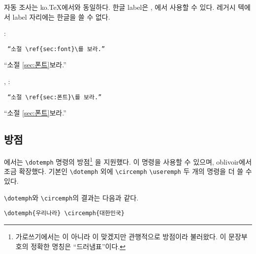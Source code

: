 \documentclass[
	12pt,
	a4paper,
	kosection,
	footnote,
	nobookmarks,
	microtype,
]{oblivoir}
\def\myREF#1#2{\ref{#1}}
\def\myREF#1#2{\ref{#2}}
\def\cs#1{\texttt{\textbackslash #1}}
\def\xetexko{\XeTeX-\ko}
\def\luatexko{\LuaTeX-\ko}
\begin{document}
자동 조사는 ko.\TeX 에서와 동일하다.
한글 label은 \XeTeX, \LuaTeX 에서 사용할 수 있다.
레거시 텍에서 label 자리에는 한글을 쓸 수 없다. 

\medskip

\noindent{}:\\
\noindent\begin{minipage}{.45\textwidth}
\begin{verbatim}
 “소절 \ref{sec:font}\를 보라.”
\end{verbatim}
\end{minipage}\hfill
\begin{minipage}{.45\textwidth}
\hfill “소절 \myREF{sec:font}{sec:폰트}\를 보라.”
\end{minipage}

\noindent{}, :\\
\noindent\begin{minipage}{.45\textwidth}
\begin{verbatim}
 “소절 \ref{sec:폰트}\를 보라.”
\end{verbatim}
\end{minipage}\hfill
\begin{minipage}{.45\textwidth}
\hfill “소절 \myREF{sec:font}{sec:폰트}\를 보라.”
\end{minipage}

\subsection{방점}

\koTeX 에서는 \texttt{\textbackslash dotemph} 명령의 방점\footnote{%
	가로쓰기에서는  이 아니라
	이 맞겠지만 관행적으로 방점이라 불러왔다.
	이 문장부호의 정확한 명칭은 “드러냄표”이다.}%
을 지원했다.   이 명령을 사용할 수 있으며,
oblivoir에서 조금 확장했다. 기본인
\texttt{\textbackslash dotemph}
외에
\texttt{\textbackslash circemph}
\texttt{\textbackslash useremph}
두 개의 명령을 더 쓸 수 있다.

\cs{dotemph}와 \cs{circemph}의 결과는 다음과 같다.

\medskip

\noindent\begin{minipage}{.45\textwidth}
\begin{verbatim}
\dotemph{우리나라} \circemph{대한민국}
\end{verbatim}
\end{minipage}\hfill
\begin{minipage}{.45\textwidth}
 
\end{minipage}
\end{document}
